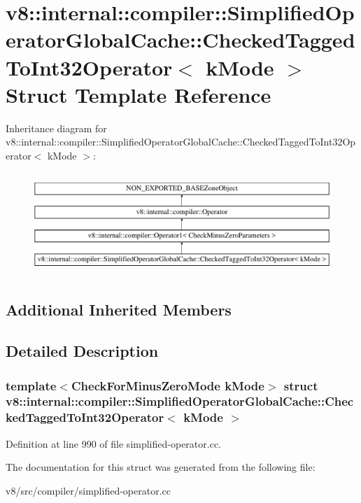 \hypertarget{structv8_1_1internal_1_1compiler_1_1SimplifiedOperatorGlobalCache_1_1CheckedTaggedToInt32Operator}{}\section{v8\+:\+:internal\+:\+:compiler\+:\+:Simplified\+Operator\+Global\+Cache\+:\+:Checked\+Tagged\+To\+Int32\+Operator$<$ k\+Mode $>$ Struct Template Reference}
\label{structv8_1_1internal_1_1compiler_1_1SimplifiedOperatorGlobalCache_1_1CheckedTaggedToInt32Operator}
Inheritance diagram for v8\+:\+:internal\+:\+:compiler\+:\+:Simplified\+Operator\+Global\+Cache\+:\+:Checked\+Tagged\+To\+Int32\+Operator$<$ k\+Mode $>$\+:\begin{figure}[H]
\begin{center}
\leavevmode
\includegraphics[height=3.916084cm]{structv8_1_1internal_1_1compiler_1_1SimplifiedOperatorGlobalCache_1_1CheckedTaggedToInt32Operator}
\end{center}
\end{figure}
\subsection*{Additional Inherited Members}


\subsection{Detailed Description}
\subsubsection*{template$<$Check\+For\+Minus\+Zero\+Mode k\+Mode$>$\newline
struct v8\+::internal\+::compiler\+::\+Simplified\+Operator\+Global\+Cache\+::\+Checked\+Tagged\+To\+Int32\+Operator$<$ k\+Mode $>$}



Definition at line 990 of file simplified-\/operator.\+cc.



The documentation for this struct was generated from the following file\+:\begin{DoxyCompactItemize}
\item 
v8/src/compiler/simplified-\/operator.\+cc\end{DoxyCompactItemize}
